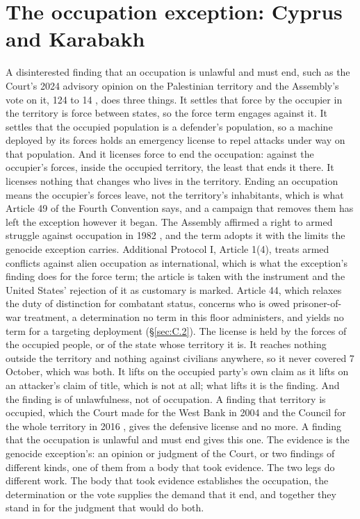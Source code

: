 \section{The occupation exception: Cyprus and Karabakh}
\label{sec:E.5}
A disinterested finding that an occupation is unlawful and must end, such as the Court's 2024 advisory opinion on the Palestinian territory \autocite{icj2024palestine} and the Assembly's vote on it, 124 to 14 \autocite{unga2024es1024}, does three things. It settles that force by the occupier in the territory is force between states, so the force term engages against it. It settles that the occupied population is a defender's population, so a machine deployed by its forces holds an emergency license to repel attacks under way on that population. And it licenses force to end the occupation: against the occupier's forces, inside the occupied territory, the least that ends it there. It licenses nothing that changes who lives in the territory. Ending an occupation means the occupier's forces leave, not the territory's inhabitants, which is what Article 49 of the Fourth Convention says, and a campaign that removes them has left the exception however it began. The Assembly affirmed a right to armed struggle against occupation in 1982 \autocite{unga1982res3743}, and the term adopts it with the limits the genocide exception carries. Additional Protocol I, Article 1(4), treats armed conflicts against alien occupation as international, which is what the exception's finding does for the force term; the article is taken with the instrument and the United States' rejection of it as customary is marked. Article 44, which relaxes the duty of distinction for combatant status, concerns who is owed prisoner-of-war treatment, a determination no term in this floor administers, and yields no term for a targeting deployment (\S\ref{sec:C.2}). The license is held by the forces of the occupied people, or of the state whose territory it is. It reaches nothing outside the territory and nothing against civilians anywhere, so it never covered 7 October, which was both. It lifts on the occupied party's own claim as it lifts on an attacker's claim of title, which is not at all; what lifts it is the finding. And the finding is of unlawfulness, not of occupation. A finding that territory is occupied, which the Court made for the West Bank in 2004 \autocite{icj2004wall} and the Council for the whole territory in 2016 \autocite{unsc2016res2334}, gives the defensive license and no more. A finding that the occupation is unlawful and must end gives this one. The evidence is the genocide exception's: an opinion or judgment of the Court, or two findings of different kinds, one of them from a body that took evidence. The two legs do different work. The body that took evidence establishes the occupation, the determination or the vote supplies the demand that it end, and together they stand in for the judgment that would do both.

